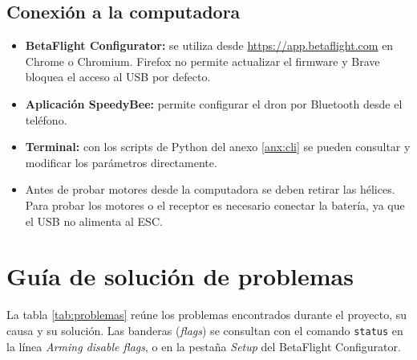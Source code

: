 \documentclass[pdflatex,sn-mathphys-num]{sn-jnl}%
\begin{document}
\subsection{Conexión a la computadora}
\begin{itemize}[nosep]
    \item \textbf{BetaFlight Configurator:} se utiliza desde \url{https://app.betaflight.com} en Chrome o Chromium. Firefox no permite actualizar el firmware y Brave bloquea el acceso al USB por defecto.
    \item \textbf{Aplicación SpeedyBee:} permite configurar el dron por Bluetooth desde el teléfono.
    \item \textbf{Terminal:} con los scripts de Python del anexo \ref{anx:cli} se pueden consultar y modificar los parámetros directamente.
    \item Antes de probar motores desde la computadora se deben retirar las hélices. Para probar los motores o el receptor es necesario conectar la batería, ya que el USB no alimenta al ESC.
\end{itemize}

\section{Guía de solución de problemas}
\label{sec:problemas}
La tabla \ref{tab:problemas} reúne los problemas encontrados durante el proyecto, su causa y su solución. Las banderas (\textit{flags}) se consultan con el comando \texttt{status} en la línea \textit{Arming disable flags}, o en la pestaña \textit{Setup} del BetaFlight Configurator.
\end{document}
